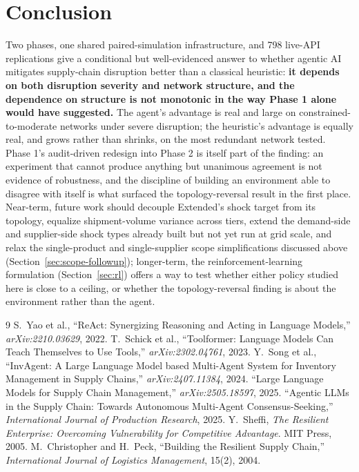 \documentclass[10pt,twocolumn]{article}
\begin{document}
\section{Conclusion}
Two phases, one shared paired-simulation infrastructure, and 798 live-API replications give a conditional but well-evidenced answer to whether agentic AI mitigates supply-chain disruption better than a classical heuristic: \textbf{it depends on both disruption severity and network structure, and the dependence on structure is not monotonic in the way Phase 1 alone would have suggested.} The agent's advantage is real and large on constrained-to-moderate networks under severe disruption; the heuristic's advantage is equally real, and grows rather than shrinks, on the most redundant network tested. Phase 1's audit-driven redesign into Phase 2 is itself part of the finding: an experiment that cannot produce anything but unanimous agreement is not evidence of robustness, and the discipline of building an environment able to disagree with itself is what surfaced the topology-reversal result in the first place. Near-term, future work should decouple Extended's shock target from its topology, equalize shipment-volume variance across tiers, extend the demand-side and supplier-side shock types already built but not yet run at grid scale, and relax the single-product and single-supplier scope simplifications discussed above (Section~\ref{sec:scope-followup}); longer-term, the reinforcement-learning formulation (Section~\ref{sec:rl}) offers a way to test whether either policy studied here is close to a ceiling, or whether the topology-reversal finding is about the environment rather than the agent.

\begin{thebibliography}{9}
\footnotesize
{} S.~Yao et al., ``ReAct: Synergizing Reasoning and Acting in Language Models,'' \emph{arXiv:2210.03629}, 2022.
 T.~Schick et al., ``Toolformer: Language Models Can Teach Themselves to Use Tools,'' \emph{arXiv:2302.04761}, 2023.
 Y.~Song et al., ``InvAgent: A Large Language Model based Multi-Agent System for Inventory Management in Supply Chains,'' \emph{arXiv:2407.11384}, 2024.
 ``Large Language Models for Supply Chain Management,'' \emph{arXiv:2505.18597}, 2025.
 ``Agentic LLMs in the Supply Chain: Towards Autonomous Multi-Agent Consensus-Seeking,'' \emph{International Journal of Production Research}, 2025.
 Y.~Sheffi, \emph{The Resilient Enterprise: Overcoming Vulnerability for Competitive Advantage}. MIT Press, 2005.
 M.~Christopher and H.~Peck, ``Building the Resilient Supply Chain,'' \emph{International Journal of Logistics Management}, 15(2), 2004.
\end{thebibliography}
\end{document}
